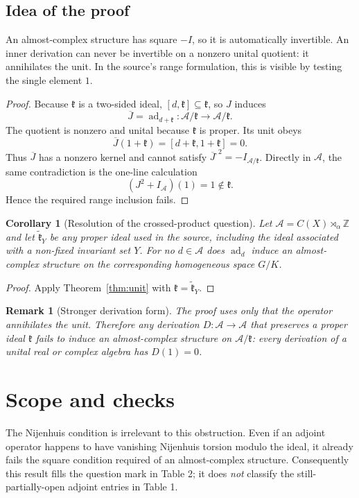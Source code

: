 \documentclass[11pt]{article}
\newtheorem{corollary}[theorem]{Corollary}
\newtheorem{remark}[theorem]{Remark}
\newcommand{\A}{\mathcal A}
\newcommand{\I}{\mathfrak k}
\newcommand{\ad}{\operatorname{ad}}
\begin{document}
\subsection*{Idea of the proof}

An almost-complex structure has square $-I$, so it is automatically
invertible.  An inner derivation can never be invertible on a nonzero
unital quotient: it annihilates the unit.  In the source's range
formulation, this is visible by testing the single element $1$.

\begin{proof}
Because $\I$ is a two-sided ideal, $[d,\I]\subseteq\I$, so $J$ induces
\[
 \overline J=\ad_{d+\I}:\A/\I\longrightarrow\A/\I.
\]
The quotient is nonzero and unital because $\I$ is proper.  Its unit obeys
\[
                 \overline J(1+\I)=[d+\I,1+\I]=0.
\]
Thus $\overline J$ has a nonzero kernel and cannot satisfy
$\overline J^{,2}=-I_{\A/\I}$.  Directly in $\A$, the same contradiction
is the one-line calculation
\[
                  (J^2+I_{\A})(1)=1\notin\I.
\]
Hence the required range inclusion fails.
\end{proof}

\begin{corollary}[Resolution of the crossed-product question]
Let $\A=C(X)\rtimes_\alpha\mathbb Z$ and let $\widetilde{\mathfrak k}_Y$
be any proper ideal used in the source, including the ideal associated with
a non-fixed invariant set $Y$.  For no $d\in\A$ does
$\ad_d$ induce an almost-complex structure on the corresponding
homogeneous space $G/K$.
\end{corollary}

\begin{proof}
Apply Theorem~\ref{thm:unit} with
$\I=\widetilde{\mathfrak k}_Y$.
\end{proof}

\begin{remark}[Stronger derivation form]
The proof uses only that the operator annihilates the unit.  Therefore any
derivation $D:\A\to\A$ that preserves a proper ideal $\I$ fails to induce
an almost-complex structure on $\A/\I$: every derivation of a unital
real or complex algebra has $D(1)=0$.
\end{remark}

\section{Scope and checks}

The Nijenhuis condition is irrelevant to this obstruction.  Even if an
adjoint operator happens to have vanishing Nijenhuis torsion modulo the
ideal, it already fails the square condition required of an almost-complex
structure.  Consequently this result fills the question mark in Table 2;
it does \emph{not} classify the still-partially-open adjoint entries in
Table 1.
\end{document}
